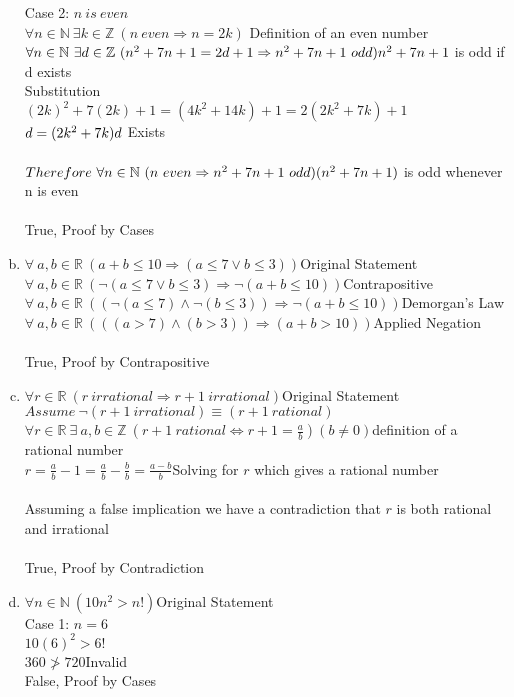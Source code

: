 \documentclass[11pt,letterpaper]{article}
\begin{document}
\begin{enumerate}[(a)]
Case 2: $n~is~even$\\
$\forall n\in\mathbb{N}~\exists k\in\mathbb{Z}~(n~even\Rightarrow n =2k)$ \hfill Definition of an even number\\
$\forall n\in\mathbb{N}~\exists d\in\mathbb{Z}~(n^2+7n+1 = 2d+1 \Rightarrow n^2+7n+1~odd)\hfill n^2+7n+1$ is odd if d exists\\
Substitution\\
$(2k)^2 + 7(2k) + 1 = (4k^2 + 14k) + 1 = 2(2k^2 + 7k) + 1$\\
$d = (2k^2 + 7k)\hfill d$ Exists\\
\\
$Therefore~\forall n\in\mathbb{N}~(n~even\Rightarrow n^2 +7n +1~odd)\hfill (n^2 +7n +1)$ is odd whenever n is even\\
\\
True, Proof by Cases
\\
\item
$\forall ~a,b\in\mathbb{R}~(a+b\leq 10\Rightarrow (a\leq 7 \vee b\leq 3))$\hfill Original Statement\\
$\forall ~a,b\in\mathbb{R}~(\neg(a\leq 7 \vee b\leq 3) \Rightarrow \neg(a+b\leq 10))$\hfill Contrapositive\\
$\forall ~a,b\in\mathbb{R}~((\neg(a\leq 7) \wedge \neg(b\leq 3)) \Rightarrow \neg(a+b\leq 10))$\hfill Demorgan's Law\\
$\forall ~a,b\in\mathbb{R}~(((a> 7) \wedge (b> 3)) \Rightarrow (a+b> 10))$\hfill Applied Negation\\
\\
True, Proof by Contrapositive
\clearpage

\item
$\forall r\in\mathbb{R}~(r~irrational\Rightarrow r+1~irrational)$\hfill Original Statement\\
$Assume~\neg(r+1~irrational)\equiv (r+1~rational)$\\
$\forall r\in\mathbb{R}~\exists~a,b\in\mathbb{Z}~(r+1~rational\Leftrightarrow r+1=\frac{a}{b})(b\neq 0)$\hfill definition of a rational number\\
$r= \frac{a}{b}-1=\frac{a}{b}-\frac{b}{b}=\frac{a-b}{b}$\hfill Solving for $r$ which gives a rational number\\
\\
Assuming a false implication we have a contradiction that $r$ is both rational and irrational\\
\\
True, Proof by Contradiction
\\
\item
$\forall n\in\mathbb{N}~(10n^2>n!)$\hfill Original Statement\\
Case 1: $n=6$\\
$10(6)^2 > 6!$\\
$360 \not> 720$\hfill Invalid\\

False, Proof by Cases
\end{enumerate}

\clearpage
\end{document}
